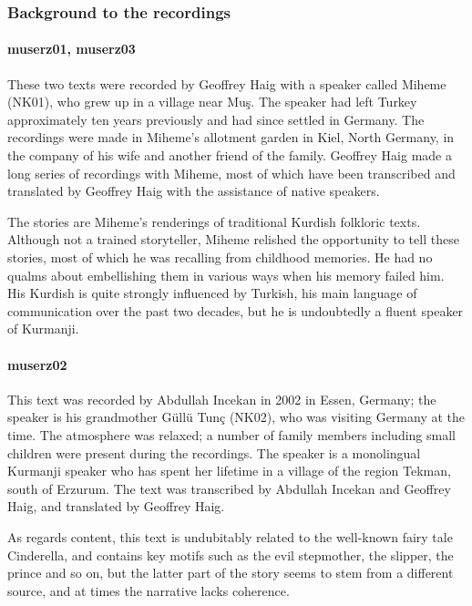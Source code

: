 \subsubsection*{Background to the recordings}

\paragraph{muserz01, muserz03}
These two texts were recorded by Geoffrey Haig with a speaker called Miheme (NK01), who grew up in a village near Muş. The speaker had left Turkey approximately ten years previously and had since settled in Germany. The recordings were made in Miheme's allotment garden in Kiel, North Germany, in the company of his wife and another friend of the family. Geoffrey Haig made a long series of recordings with Miheme, most of which have been transcribed and translated by Geoffrey Haig with the assistance of native speakers.

The stories are Miheme's renderings of traditional Kurdish folkloric texts. Although not a trained storyteller, Miheme relished the opportunity to tell these stories, most of which he was recalling from childhood memories. He had no qualms about embellishing them in various ways when his memory failed him. His Kurdish is quite strongly influenced by Turkish, his main language of communication over the past two decades, but he is undoubtedly a fluent speaker of Kurmanji.

\paragraph{muserz02}
This text was recorded by Abdullah Incekan in 2002 in Essen, Germany; the speaker is his grandmother Güllü Tunç (NK02), who was visiting Germany at the time. The atmosphere was relaxed; a number of family members including small children were present during the recordings. The speaker is a monolingual Kurmanji speaker who has spent her lifetime in a village of the region Tekman, south of Erzurum. The text was transcribed by Abdullah Incekan and Geoffrey Haig, and translated by Geoffrey Haig.

As regards content, this text is undubitably related to the well-known fairy tale Cinderella, and contains key motifs such as the evil stepmother, the slipper, the prince and so on, but the latter part of the story seems to stem from a different source, and at times the narrative lacks coherence.



